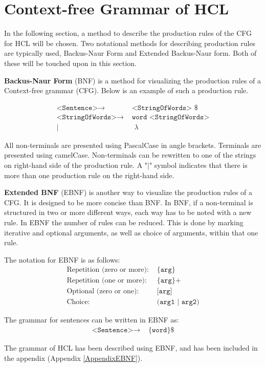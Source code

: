 \section{Context-free Grammar of HCL}
\label{CFGdescription}
In the following section, a method to describe the production rules of the CFG for HCL will be chosen.
Two notational methods for describing production rules are typically used, Backus-Naur Form and Extended Backus-Naur form. 
Both of these will be touched upon in this section.

\textbf{Backus-Naur Form} (BNF) is a method for visualizing the production rules of a Context-free grammar (CFG).
Below is an example of such a production rule.

\begin{align*}
	\texttt{<Sentence>}\to & \texttt{ <StringOfWords> \$}\\
	\texttt{<StringOfWords>}\to & \texttt{ word <StringOfWords>}\\
	| & \texttt{ }\lambda
\end{align*}

All non-terminals are presented using PascalCase in angle brackets.
Terminals are presented using camelCase.
Non-terminals can be rewritten to one of the strings on right-hand side of the production rule.
A "|" symbol indicates that there is more than one production rule on the right-hand side.

\textbf{Extended BNF} (EBNF) is another way to visualize the production rules of a CFG.
It is designed to be more concise than BNF.
In BNF, if a non-terminal is structured in two or more different ways, each way has to be noted with a new rule.
In EBNF the number of rules can be reduced.
This is done by marking iterative and optional arguments, as well as choice of arguments, within that one rule.
\cite{SebestaEBNF}

The notation for EBNF is as follows:
\begin{align*}
	\text{Repetition (zero or more):} & \texttt{ \{arg\}}\\
	\text{Repetition (one or more):} & \texttt{ \{arg\}+}\\
	\text{Optional (zero or one):} & \texttt{ [arg]}\\
	\text{Choice:} & \texttt{ (arg1 | arg2)}
\end{align*}

The grammar for sentences can be written in EBNF as:
\begin{align*}
	\texttt{<Sentence>}\to & \texttt{ \{word\} \$}
\end{align*}

The grammar of HCL has been described using EBNF, and has been included in the appendix (Appendix \ref{AppendixEBNF}).
